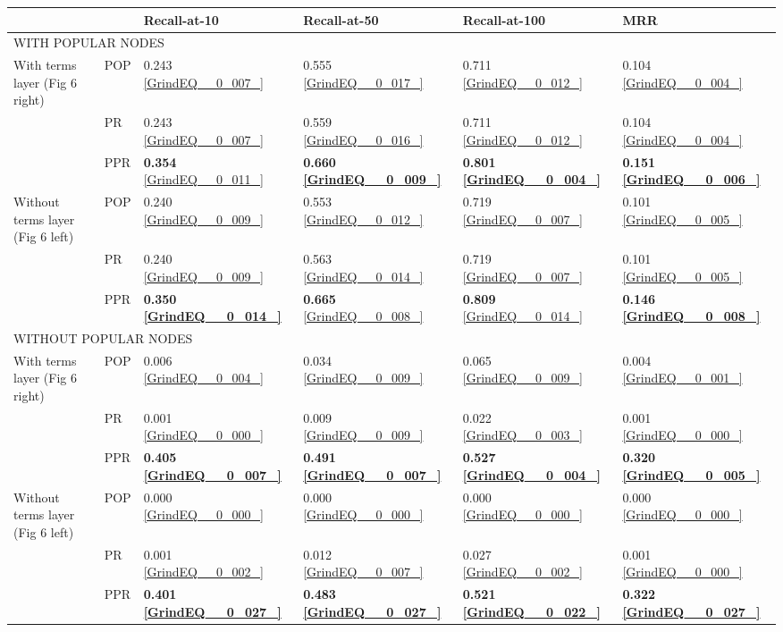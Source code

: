 \documentclass{article} %
\begin{document}
\begin{tabular}{|p{0.7in}|p{0.7in}|p{0.7in}|p{0.7in}|p{0.7in}|p{0.7in}|} \hline 
\multicolumn{2}{|p{1in}|}{} &  Recall-at-10 &  Recall-at-50 &  Recall-at-100 &  MRR \\ \hline 
\multicolumn{6}{|p{1in}|}{WITH POPULAR NODES} \\ \hline 
With terms layer (Fig 6 right)  &  POP  &  0.243 \eqref{GrindEQ__0_007_}  &  0.555 \eqref{GrindEQ__0_017_}  &  0.711 \eqref{GrindEQ__0_012_}  &  0.104 \eqref{GrindEQ__0_004_}  \\ \hline 
 &  PR  &  0.243 \eqref{GrindEQ__0_007_}  &  0.559 \eqref{GrindEQ__0_016_}  &  0.711 \eqref{GrindEQ__0_012_}  &  0.104 \eqref{GrindEQ__0_004_}  \\ \hline 
 &  PPR  &  \textbf{0.354} \eqref{GrindEQ__0_011_}  & \textbf{ 0.660 \eqref{GrindEQ__0_009_} } & \textbf{ 0.801 \eqref{GrindEQ__0_004_} } & \textbf{ 0.151 \eqref{GrindEQ__0_006_} } \\ \hline 
Without terms layer (Fig 6 left) &  POP  &  0.240 \eqref{GrindEQ__0_009_}  &  0.553 \eqref{GrindEQ__0_012_}  &  0.719 \eqref{GrindEQ__0_007_}  &  0.101 \eqref{GrindEQ__0_005_}  \\ \hline 
 &  PR  &  0.240 \eqref{GrindEQ__0_009_}  &  0.563 \eqref{GrindEQ__0_014_}  &  0.719 \eqref{GrindEQ__0_007_}  &  0.101 \eqref{GrindEQ__0_005_}  \\ \hline 
 &  PPR  &  \textbf{0.350 \eqref{GrindEQ__0_014_} } &  \textbf{0.665} \eqref{GrindEQ__0_008_}  &  \textbf{0.809} \eqref{GrindEQ__0_014_}  &  \textbf{0.146 \eqref{GrindEQ__0_008_} } \\ \hline 
\multicolumn{6}{|p{1in}|}{WITHOUT POPULAR NODES} \\ \hline 
With terms layer (Fig 6 right) &  POP  &  0.006 \eqref{GrindEQ__0_004_}  &  0.034 \eqref{GrindEQ__0_009_}  &  0.065 \eqref{GrindEQ__0_009_}  &  0.004 \eqref{GrindEQ__0_001_}  \\ \hline 
 &  PR  &  0.001 \eqref{GrindEQ__0_000_}  &  0.009 \eqref{GrindEQ__0_009_}  &  0.022 \eqref{GrindEQ__0_003_}  &  0.001 \eqref{GrindEQ__0_000_}  \\ \hline 
 &  PPR  &  \textbf{0.405 \eqref{GrindEQ__0_007_} } &  \textbf{0.491 \eqref{GrindEQ__0_007_} } &  \textbf{0.527 \eqref{GrindEQ__0_004_} } &  \textbf{0.320 \eqref{GrindEQ__0_005_} } \\ \hline 
Without terms layer (Fig 6 left) &  POP  &  0.000 \eqref{GrindEQ__0_000_}  &  0.000 \eqref{GrindEQ__0_000_}  &  0.000 \eqref{GrindEQ__0_000_}  &  0.000 \eqref{GrindEQ__0_000_}  \\ \hline 
 &  PR  &  0.001 \eqref{GrindEQ__0_002_}  &  0.012 \eqref{GrindEQ__0_007_}  &  0.027 \eqref{GrindEQ__0_002_}  &  0.001 \eqref{GrindEQ__0_000_}  \\ \hline 
 &  PPR  & \textbf{ 0.401 \eqref{GrindEQ__0_027_} } & \textbf{ 0.483 \eqref{GrindEQ__0_027_} } & \textbf{ 0.521 \eqref{GrindEQ__0_022_} } &  \textbf{0.322 \eqref{GrindEQ__0_027_} } \\ \hline 
\end{tabular}
\end{document}
